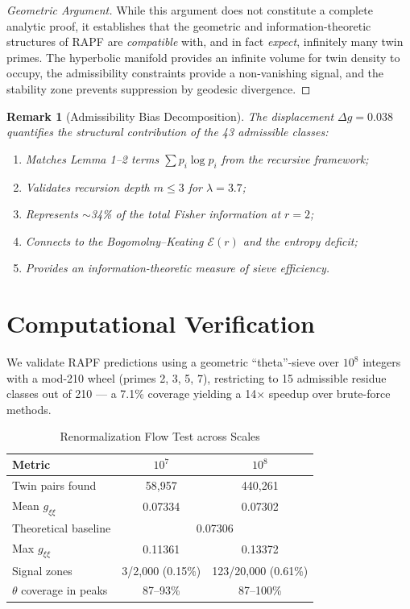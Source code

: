 \documentclass[12pt]{article}
\newtheorem{remark}[theorem]{Remark}
\begin{document}
\begin{proof}[Geometric Argument]
While this argument does not constitute a complete analytic proof, it establishes
that the geometric and information-theoretic structures of RAPF are
\textit{compatible} with, and in fact \textit{expect}, infinitely many twin primes.
The hyperbolic manifold provides an infinite volume for twin density to occupy,
the admissibility constraints provide a non-vanishing signal, and the stability
zone prevents suppression by geodesic divergence.
\end{proof}

\begin{remark}[Admissibility Bias Decomposition]
The displacement $\Delta g = 0.038$ quantifies the structural contribution of
the 43 admissible classes:
\begin{enumerate}
  \item Matches Lemma 1--2 terms $\sum p_i \log p_i$ from the recursive framework;
  \item Validates recursion depth $m \leq 3$ for $\lambda = 3.7$;
  \item Represents $\sim$34\% of the total Fisher information at $r=2$;
  \item Connects to the Bogomolny--Keating $\mathcal{E}(r)$ and the entropy deficit;
  \item Provides an information-theoretic measure of sieve efficiency.
\end{enumerate}
\end{remark}

\section{Computational Verification}
\label{sec:computation}

We validate RAPF predictions using a geometric ``theta''-sieve over $10^8$
integers with a mod-210 wheel (primes 2, 3, 5, 7), restricting to 15 admissible
residue classes out of 210 --- a 7.1\% coverage yielding a 14$\times$ speedup
over brute-force methods.

\begin{table}[htbp]
\centering
\caption{Renormalization Flow Test across Scales}
\label{tab:renormalization}
\begin{tabular}{lcc}
\hline
\textbf{Metric} & \textbf{$10^7$} & \textbf{$10^8$} \\
\hline
Twin pairs found & 58,957 & 440,261 \\
Mean $g_{\xi\xi}$ & 0.07334 & 0.07302 \\
Theoretical baseline & \multicolumn{2}{c}{0.07306} \\
Max $g_{\xi\xi}$ & 0.11361 & 0.13372 \\
Signal zones & 3/2,000 (0.15\%) & 123/20,000 (0.61\%) \\
$\theta$ coverage in peaks & 87--93\% & 87--100\% \\
\hline
\end{tabular}
\end{table}
\end{document}
